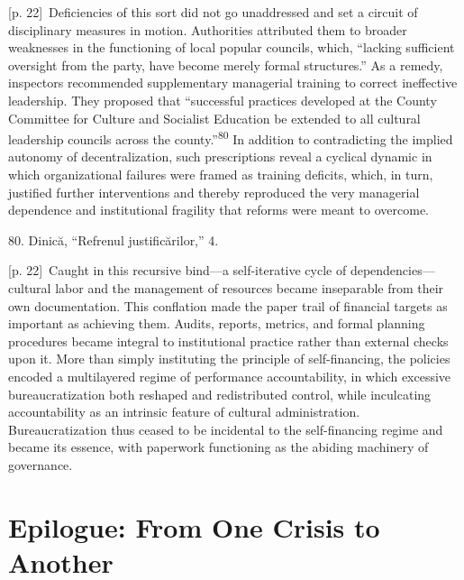 \documentclass[10pt,a4paper]{article}
\begin{document}
{\scriptsize\color{gray} [p. 22]}\ Deficiencies of this sort did not go unaddressed and set a circuit of disciplinary measures in motion. Authorities attributed them to broader weaknesses in the functioning of local popular councils, which, “lacking sufficient oversight from the party, have become merely formal structures.” As a remedy, inspectors recommended supplementary managerial training to correct ineffective leadership. They proposed that “successful practices developed at the County Committee for Culture and Socialist Education be extended to all cultural leadership councils across the county.”\nobreak\textsuperscript{80} In addition to contradicting the implied autonomy of decentralization, such prescriptions reveal a cyclical dynamic in which organizational failures were framed as training deficits, which, in turn, justified further interventions and thereby reproduced the very managerial dependence and institutional fragility that reforms were meant to overcome.\par{\small 80. Dinică, “Refrenul justificărilor,” 4.\par}
{\scriptsize\color{gray} [p. 22]}\ Caught in this recursive bind—a self-iterative cycle of dependencies—cultural labor and the management of resources became inseparable from their own documentation. This conflation made the paper trail of financial targets as important as achieving them. Audits, reports, metrics, and formal planning procedures became integral to institutional practice rather than external checks upon it. More than simply instituting the principle of self-financing, the policies encoded a multilayered regime of performance accountability, in which excessive bureaucratization both reshaped and redistributed control, while inculcating accountability as an intrinsic feature of cultural administration. Bureaucratization thus ceased to be incidental to the self-financing regime and became its essence, with paperwork functioning as the abiding machinery of governance.\par
{}\section*{Epilogue: From One Crisis to Another}
\end{document}
